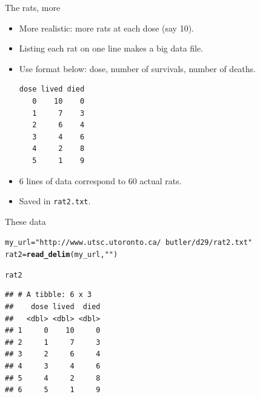 \documentclass[unknownkeysallowed]{beamer}\usepackage[]{graphicx}\usepackage[]{color}
\makeatletter
\newcommand{\hlstr}[1]{\textcolor[rgb]{0.192,0.494,0.8}{#1}}%
\newcommand{\hlstd}[1]{\textcolor[rgb]{0.345,0.345,0.345}{#1}}%
\newcommand{\hlkwb}[1]{\textcolor[rgb]{0.69,0.353,0.396}{#1}}%
\newcommand{\hlkwd}[1]{\textcolor[rgb]{0.737,0.353,0.396}{\textbf{#1}}}%
\newenvironment{kframe}{%
 \def\at@end@of@kframe{}%
 \ifinner\ifhmode%
  \def\at@end@of@kframe{\end{minipage}}%
  \begin{minipage}{\columnwidth}%
 \fi\fi%
 \def\FrameCommand##1{\hskip\@totalleftmargin \hskip-\fboxsep
 \colorbox{shadecolor}{##1}\hskip-\fboxsep
     \hskip-\linewidth \hskip-\@totalleftmargin \hskip\columnwidth}%
 \MakeFramed {\advance\hsize-\width
   \@totalleftmargin\z@ \linewidth\hsize
   \@setminipage}}%
 {\par\unskip\endMakeFramed%
 \at@end@of@kframe}
\newenvironment{knitrout}{}{} %
\makeatother
\begin{document}
\begin{frame}[fragile]{The rats, more}

  \begin{itemize}
  \item More realistic: more rats at each dose (say 10).
  \item Listing each rat on one line makes a big data file.
  \item Use format below: dose, number of survivals, number of deaths.
\begin{verbatim}
dose lived died
   0    10    0
   1     7    3 
   2     6    4 
   3     4    6 
   4     2    8 
   5     1    9  
\end{verbatim}


  \item 6 lines of data correspond to 60 actual rats.

  \item Saved in \texttt{rat2.txt}.

  \end{itemize}
  
\end{frame}

\begin{frame}[fragile]{These data}

 
\begin{knitrout}\footnotesize
{}\color{fgcolor}\begin{kframe}
\begin{alltt}
\hlstd{my_url}\hlkwb{=}\hlstr{"http://www.utsc.utoronto.ca/~butler/d29/rat2.txt"}
\hlstd{rat2}\hlkwb{=}\hlkwd{read_delim}\hlstd{(my_url,}\hlstr{" "}\hlstd{)}
\end{alltt}


{\ttfamily\noindent\itshape\color{messagecolor}{\#\# Parsed with column specification:\\\#\# cols(\\\#\#\ \  dose = col\_double(),\\\#\#\ \  lived = col\_double(),\\\#\#\ \  died = col\_double()\\\#\# )}}\begin{alltt}
\hlstd{rat2}
\end{alltt}
\begin{verbatim}
## # A tibble: 6 x 3
##    dose lived  died
##   <dbl> <dbl> <dbl>
## 1     0    10     0
## 2     1     7     3
## 3     2     6     4
## 4     3     4     6
## 5     4     2     8
## 6     5     1     9
\end{verbatim}
\end{kframe}
\end{knitrout}
  


  
\end{frame}
\end{document}
